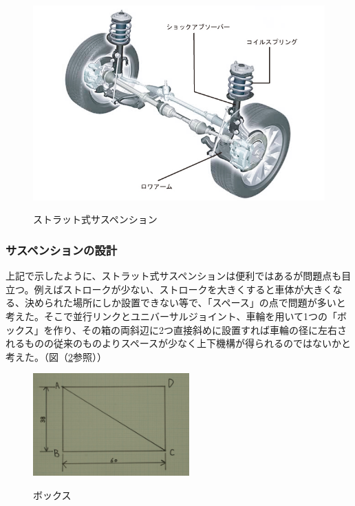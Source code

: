 \documentclass[11pt]{jsarticle}
\begin{document}
\begin{figure}[htbt]
 \begin{center}
  \includegraphics[width=120mm]{strat.jpg}
 　\caption{ストラット式サスペンション}
  \label{fig:strat}%
 \end{center}
\end{figure}


\subsubsection{サスペンションの設計}
上記で示したように、ストラット式サスペンションは便利ではあるが問題点も目立つ。例えばストロークが少ない、ストロークを大きくすると車体が大きくなる、決められた場所にしか設置できない等で、「スペース」の点で問題が多いと考えた。そこで並行リンクとユニバーサルジョイント、車輪を用いて1つの「ボックス」を作り、その箱の両斜辺に2つ直接斜めに設置すれば車輪の径に左右されるものの従来のものよりスペースが少なく上下機構が得られるのではないかと考えた。（図（\ref{fig:box}参照））

\begin{figure}[htbt]
 \begin{center}
  \includegraphics[width=60mm]{kanizu.jpg}
 　\caption{ボックス}
  \label{fig:box}%
 \end{center}
\end{figure}
\end{document}
